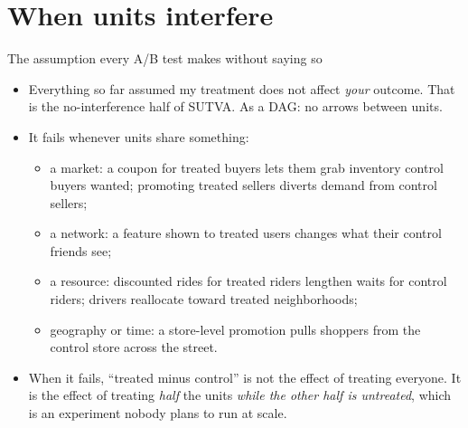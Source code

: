 \documentclass[aspectratio=169,11pt]{beamer}
\begin{document}
\section{When units interfere}

\begin{frame}{The assumption every A/B test makes without saying so}
\begin{itemize}
	\item Everything so far assumed my treatment does not affect \emph{your} outcome. That is the
	\alert{no-interference} half of SUTVA. As a DAG: no arrows between units.
	\medskip
	\item It fails whenever units share something:
	\begin{itemize}
		\item a \alert{market}: a coupon for treated buyers lets them grab inventory control buyers wanted;
		promoting treated sellers diverts demand from control sellers;
		\item a \alert{network}: a feature shown to treated users changes what their control friends see;
		\item a \alert{resource}: discounted rides for treated riders lengthen waits for control riders;
		drivers reallocate toward treated neighborhoods;
		\item \alert{geography or time}: a store-level promotion pulls shoppers from the control store across the street.
	\end{itemize}
	\medskip
	\item When it fails, ``treated minus control'' is not the effect of treating everyone. It is the effect of
	treating \emph{half} the units \emph{while the other half is untreated}, which is an experiment nobody
	plans to run at scale.
\end{itemize}
\end{frame}
\end{document}
